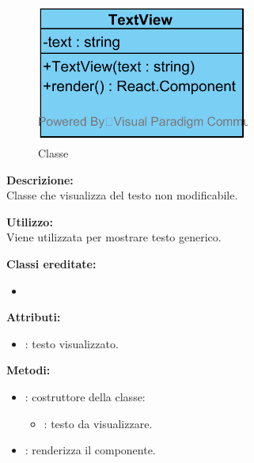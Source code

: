 \paragraph[::TextView]{\class}\mbox{}\\ \label{\class}
\begin{figure}[H]
	\centering
	\includegraphics[width=7cm]{./diagrammi/framework/view/gui/textview.png}
	\caption{Classe \class}
\end{figure}
\textbf{Descrizione:}\\
Classe che visualizza del testo non modificabile.

\textbf{Utilizzo:}\\
Viene utilizzata per mostrare testo generico.

\textbf{Classi ereditate:}
\begin{itemize}
	\item {}
\end{itemize}


\textbf{Attributi:}
\begin{itemize}
	\item {}: testo visualizzato.
\end{itemize}

\textbf{Metodi:}
\begin{itemize}
	\item {}: costruttore della classe:
	\begin{itemize}
		\item {}: testo da visualizzare.
	\end{itemize}
	\item {}: renderizza il componente.
\end{itemize}
